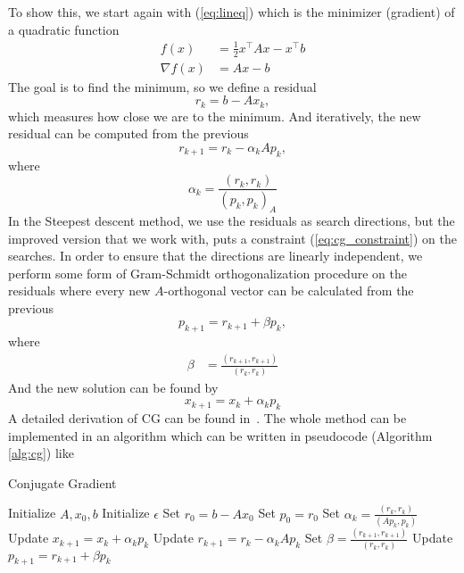 To show this, we start again with (\cref{eq:lineq}) which is the minimizer (gradient) of a quadratic function
\begin{equation}
    \begin{aligned}
        f(x) &= \frac{1}{2} x^\top A x - x^\top b
        \\
        \nabla f(x) &=  Ax - b
    \end{aligned}
\end{equation}
The goal is to find the minimum, so we define a residual 
\begin{equation}
    r_k = b - Ax_k,
\end{equation}
which measures how close we are to the minimum. And iteratively, the new residual can be computed from the previous
\begin{equation}
    r_{k+1} = r_k - \alpha_k Ap_k,
\end{equation}
where
\begin{equation}
    \alpha_k = \frac{\left( r_k, r_k \right)}{\left( p_k, p_k \right)_A}
\end{equation}
In the Steepest descent method, we use the residuals as search directions, but the improved version that we work with, puts a constraint (\cref{eq:cg_constraint}) on the searches. In order to ensure that the directions are linearly independent, we perform some form of Gram-Schmidt orthogonalization procedure on the residuals where every new $A$-orthogonal vector can be calculated from the previous
\begin{equation}
    p_{k+1} = r_{k+1} + \beta p_k,
\end{equation}
where
\begin{align}
    \beta &= \frac{\left( r_{k+1}, r_{k+1} \right)}{\left( r_k, r_k \right)}
\end{align}
And the new solution can be found by
\begin{equation}
    x_{k+1} = x_k + \alpha_k p_k
\end{equation}
A detailed derivation of CG can be found in~\cite{cgbook}. The whole method can be implemented in an algorithm which can be written in pseudocode (Algorithm \cref{alg:cg}) like

\begin{algorithm}
    \caption{Conjugate Gradient}
    \begin{algorithmic}[1]
        \State Initialize  $A, x_0, b$
        \State Initialize $\epsilon$ 
        \State Set $r_0 = b - Ax_0$ 
        \State Set $p_0 = r_0$ 
            \State Set $\alpha_k = \frac{\left( r_k, r_k \right)}{\left( Ap_k, p_k \right)}$
            \State Update $x_{k+1} = x_k + \alpha_k p_k$
            \State Update $r_{k+1} = r_k - \alpha_k Ap_k$
            \State Set $\beta = \frac{\left( r_{k+1}, r_{k+1} \right)}{\left( r_k, r_k \right)}$
            \State Update $p_{k+1} = r_{k+1} + \beta p_k$
        \EndWhile
    \end{algorithmic}
    \label{alg:cg}
    \end{algorithm}

